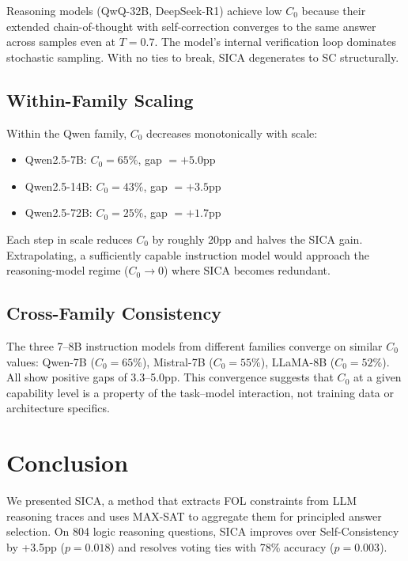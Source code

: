 \documentclass[11pt,a4paper]{article}
\begin{document}
Reasoning models (QwQ-32B, DeepSeek-R1) achieve low $C_0$ because their extended chain-of-thought with self-correction converges to the same answer across samples even at $T=0.7$. The model's internal verification loop dominates stochastic sampling. With no ties to break, SICA degenerates to SC structurally.

\subsection{Within-Family Scaling}

Within the Qwen family, $C_0$ decreases monotonically with scale:
\begin{itemize}
\item Qwen2.5-7B: $C_0=65\%$, gap $=+5.0$pp
\item Qwen2.5-14B: $C_0=43\%$, gap $=+3.5$pp
\item Qwen2.5-72B: $C_0=25\%$, gap $=+1.7$pp
\end{itemize}

Each step in scale reduces $C_0$ by roughly 20pp and halves the SICA gain. Extrapolating, a sufficiently capable instruction model would approach the reasoning-model regime ($C_0 \rightarrow 0$) where SICA becomes redundant.

\subsection{Cross-Family Consistency}

The three 7--8B instruction models from different families converge on similar $C_0$ values: Qwen-7B ($C_0=65\%$), Mistral-7B ($C_0=55\%$), LLaMA-8B ($C_0=52\%$). All show positive gaps of 3.3--5.0pp. This convergence suggests that $C_0$ at a given capability level is a property of the task--model interaction, not training data or architecture specifics.

\section{Conclusion}
\label{sec:conclusion}

We presented SICA, a method that extracts FOL constraints from LLM reasoning traces and uses MAX-SAT to aggregate them for principled answer selection. On 804 logic reasoning questions, SICA improves over Self-Consistency by +3.5pp ($p=0.018$) and resolves voting ties with 78\% accuracy ($p=0.003$).
\end{document}
